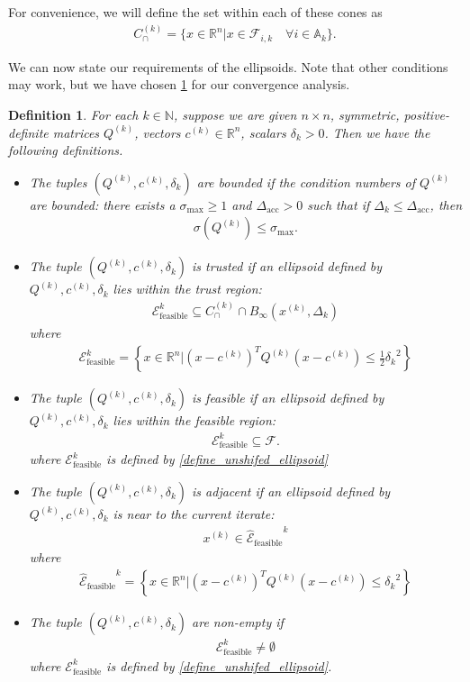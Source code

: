 \documentclass{article}
\newtheorem{definition}{Definition}[theorem]
\theoremstyle{case}
\numberwithin{theorem}{subsection}
\newcommand{\activeconstraintsk}{{\mathbb A_{k}}}
\newcommand{\capcones}{{C^{(k)}_{\cap}}}
\newcommand{\ck}{{c^{(k)}}}
\newcommand{\dacc}{{\Delta_{\textrm{acc}}}}
\newcommand{\dk}{\Delta_k}
\newcommand{\feasible}{{\mathcal F}}
\newcommand{\fik}{{\mathcal F_{i, k}}}
\newcommand{\naturals}{\mathbb N}
\newcommand{\qk}{{Q^{(k)}}}
\newcommand{\Rn}{\mathbb R^n}
\newcommand{\scaledunshiftedellipsoid}{{{\mathcal {\hat E}_{\text{feasible}}}^k}}
\newcommand{\sdk}{{\delta_k}}
\newcommand{\sigmamax}{{\sigma_{\textrm{max}}}}
\newcommand{\tr}{{ B_{\infty}\left(\xk, \dk\right) }}
\newcommand{\unshiftedellipsoid}{{\mathcal E^k_{\textrm{feasible}}}}
\newcommand{\xk}{{x^{(k)}}}
\begin{document}
For convenience, we will define the set within each of these cones as
\begin{align}
\label{define_capcones}
\capcones = \{x\in\Rn | x \in \fik \quad \forall i \in \activeconstraintsk \}.
\end{align}


We can now state our requirements of the ellipsoids.
Note that other conditions may work, but we have chosen \cref{ellipsoids_notation_definitions} for our convergence analysis.

\begin{definition}
\label{ellipsoids_notation_definitions}
For each $k \in \naturals$, suppose we are given $n\times n$, symmetric, positive-definite matrices $\qk$, vectors $\ck \in \Rn$, scalars $\sdk > 0$.
Then we have the following definitions.
\begin{itemize}
\item The tuples $(\qk, \ck, \sdk)$ are \emph{bounded} if the condition numbers of $\qk$ are bounded:
there exists a $\sigmamax \ge 1$ and $\dacc > 0$ such that if $\dk \le \dacc$, then
\begin{align}
\sigma(Q^{(k)}) \le \sigmamax. \label{define_suitable_condition_numbers}
\end{align}
\item The tuple $(\qk, \ck, \sdk)$ is \emph{trusted} if an ellipsoid defined by $\qk, \ck, \sdk$ lies within the trust region:
\begin{align}
\unshiftedellipsoid \subseteq \capcones \cap \tr  \label{define_suitable_in_tr}
\end{align}
where
\begin{align}
\unshiftedellipsoid = \left\{x \in \Rn | \left(x - \ck \right)^T \qk \left(x - \ck\right) \le \frac 1 2 {\sdk}^2 \right\} \label{define_unshifed_ellipsoid}
\end{align}
\item The tuple $(\qk, \ck, \sdk)$ is \emph{feasible} if an ellipsoid defined by $\qk, \ck, \sdk$ lies within the feasible region:
\begin{align}
\unshiftedellipsoid \subseteq \feasible.
\end{align}
where $\unshiftedellipsoid$ is defined by \cref{define_unshifed_ellipsoid}
\item The tuple $(\qk, \ck, \sdk)$ is \emph{adjacent} if an ellipsoid defined by $\qk, \ck, \sdk$ is near to the current iterate:
\begin{align}
\xk \in \scaledunshiftedellipsoid \label{define_suitable_close_to_iterate}
\end{align}
where
\begin{align}
\scaledunshiftedellipsoid = \left\{x \in \Rn | \left(x - \ck\right)^T \qk \left(x - \ck\right) \le {\sdk}^2 \right\}
\end{align}
\item The tuple $(\qk, \ck, \sdk)$ are \emph{non-empty} if
\begin{align}
\unshiftedellipsoid \ne \emptyset
\end{align}
where $\unshiftedellipsoid$ is defined by \cref{define_unshifed_ellipsoid}.
\end{itemize}
\end{definition}
\end{document}
